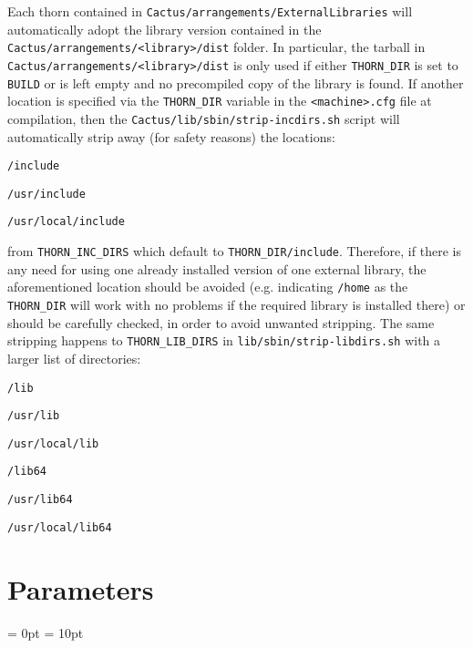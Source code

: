 Each thorn contained in \texttt{Cactus/arrangements/ExternalLibraries} will automatically adopt the library version contained in the \texttt{Cactus/arrangements/<library>/dist} folder. In particular, the tarball in \texttt{Cactus/arrangements/<library>/dist} is only used if either \texttt{THORN\_DIR} is set to \texttt{BUILD} or is left empty and no precompiled copy of the library is found. If another location is specified via the \texttt{THORN\_DIR} variable in the \texttt{<machine>.cfg} file at compilation, then the \texttt{Cactus/lib/sbin/strip-incdirs.sh} script will automatically strip away (for safety reasons) the locations:
\begin{Lentry}
\item [\texttt{/include}]
\item [\texttt{/usr/include}]
\item [\texttt{/usr/local/include}]
\end{Lentry}
from \texttt{THORN\_INC\_DIRS} which default to \texttt{THORN\_DIR/include}. Therefore, if there is any need for using one already installed version of one external library, the aforementioned location should be avoided (e.g. indicating \texttt{/home} as the \texttt{THORN\_DIR} will work with no problems if the required library is installed there) or should be carefully checked, in order to avoid unwanted stripping. The same stripping happens to \texttt{THORN\_LIB\_DIRS} in \texttt{lib/sbin/strip-libdirs.sh} with a larger list of directories:
\begin{Lentry}
\item [\texttt{/lib}]
\item [\texttt{/usr/lib}]
\item [\texttt{/usr/local/lib}]
\item [\texttt{/lib64}]
\item [\texttt{/usr/lib64}]
\item [\texttt{/usr/local/lib64}] 
\end{Lentry}


% 




\section{Parameters} 


\parskip = 0pt
\parskip = 10pt 

